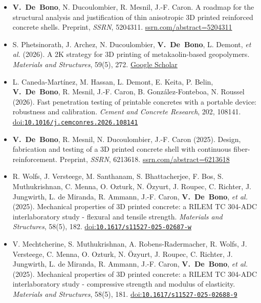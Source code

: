 \documentclass[11pt,a4paper]{article}
\newcommand{\doi}[1]{\href{https://doi.org/#1}{doi:\nolinkurl{#1}}}
\newcommand{\me}{\textbf{V.~De~Bono}}
\newenvironment{publis}[1]%
  {\begin{itemize}[label={}, leftmargin=1.2em, labelwidth=0pt, labelsep=0pt,
     itemindent=-1.2em, itemsep=0.45em, topsep=0.3em]}%
  {\end{itemize}}
\begin{document}
\begin{publis}{A}
  \item \me, N. Ducoulombier, R. Mesnil, J.-F. Caron.
  A roadmap for the structural analysis and justification of thin anisotropic 3D printed reinforced concrete shells.
  Preprint, \emph{SSRN}, 5204311.
  \href{https://papers.ssrn.com/sol3/papers.cfm?abstract_id=5204311}{ssrn.com/abstract=5204311}

  \item S. Phetsinorath, J. Archez, N. Ducoulombier, \me, L. Demont, \emph{et al.} (2026).
  A 2K strategy for 3D printing of metakaolin-based geopolymers.
  \emph{Materials and Structures}, 59(5), 272.
  \href{https://scholar.google.com/scholar?q=A+2K+strategy+for+3D+printing+of+metakaolin-based+geopolymers}{Google Scholar}

  \item L. Caneda-Martínez, M. Hassan, L. Demont, E. Keita, P. Belin, \me, R. Mesnil, J.-F. Caron, B. González-Fonteboa, N. Roussel (2026).
  Fast penetration testing of printable concretes with a portable device: robustness and calibration.
  \emph{Cement and Concrete Research}, 202, 108141.
  \doi{10.1016/j.cemconres.2026.108141}

  \item \me, R. Mesnil, N. Ducoulombier, J.-F. Caron (2025).
  Design, fabrication and testing of a 3D printed concrete shell with continuous fiber-reinforcement.
  Preprint, \emph{SSRN}, 6213618.
  \href{https://papers.ssrn.com/sol3/papers.cfm?abstract_id=6213618}{ssrn.com/abstract=6213618}

  \item R. Wolfs, J. Versteege, M. Santhanam, S. Bhattacherjee, F. Bos, S. Muthukrishnan, C. Menna, O. Ozturk, N. Özyurt, J. Roupec, C. Richter, J. Jungwirth, L. de Miranda, R. Ammann, J.-F. Caron, \me, \emph{et al.} (2025).
  Mechanical properties of 3D printed concrete: a RILEM TC 304-ADC interlaboratory study - flexural and tensile strength.
  \emph{Materials and Structures}, 58(5), 182.
  \doi{10.1617/s11527-025-02687-w}

  \item V. Mechtcherine, S. Muthukrishnan, A. Robens-Radermacher, R. Wolfs, J. Versteege, C. Menna, O. Ozturk, N. Özyurt, J. Roupec, C. Richter, J. Jungwirth, L. de Miranda, R. Ammann, J.-F. Caron, \me, \emph{et al.} (2025).
  Mechanical properties of 3D printed concrete: a RILEM TC 304-ADC interlaboratory study - compressive strength and modulus of elasticity.
  \emph{Materials and Structures}, 58(5), 181.
  \doi{10.1617/s11527-025-02688-9}


\end{publis}
\end{document}
